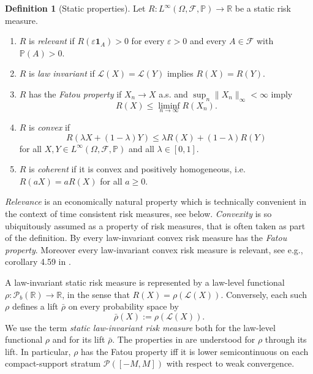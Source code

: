 \documentclass[a4paper]{amsart}
\theoremstyle{definition}
\newtheorem{definition}[definition]{Definition}
\newcommand{\R}{\mathbb{R}}
\newcommand{\F}{\mathcal{F}}
\newcommand{\law}{\mathcal{L}}
\newcommand{\Pc}{\mathcal P}
\renewcommand{\P}{\mathbb{P}}
\begin{document}
\begin{definition}[Static properties]
\label{def:static-properties}
Let \(R:L^\infty(\Omega,\F,\P)\to\R\) be a static risk measure.

\begin{enumerate}[(1)]
\item \(R\) is \emph{relevant} if
\(R(\varepsilon\mathbf 1_A)>0\) for every \(\varepsilon>0\) and every
\(A\in\F\) with \(\P(A)>0\).

\item \(R\) is \emph{law invariant} if \(\law(X)=\law(Y)\) implies
\(R(X)=R(Y)\).

\item \(R\) has the \emph{Fatou property} if \(X_n\to X\) a.s. and
\(\sup_n\|X_n\|_\infty<\infty\) imply
\[
R(X)\le\liminf_{n\to\infty}R(X_n).
\]

\item \(R\) is \emph{convex} if
\[
R(\lambda X+(1-\lambda)Y)
\le
\lambda R(X)+(1-\lambda)R(Y)
\]
for all \(X,Y\in L^\infty(\Omega,\F,\P)\) and all \(\lambda\in[0,1]\).

\item \(R\) is \emph{coherent} if it is convex and positively homogeneous,
i.e.\  \(R(aX)=aR(X)\) for all \(a\ge0\).
\end{enumerate}
\end{definition}
\emph{Relevance} is an economically natural property which is technically convenient in the context of time consistent risk measures, see  below. \emph{Convexity} is so ubiquitously assumed as a property of risk measures, that is often taken as part of the definition. By \cite{JoScTo06} every law-invariant convex risk measure has the \emph{Fatou property}. Moreover every law-invariant convex risk measure is relevant, see e.g., corollary 4.59 in \cite{follmer2025book}.


A law-invariant static risk measure is represented by a law-level functional
\(\rho:\Pc_b(\R)\to\R\), in the sense that \(R(X)=\rho(\law(X))\). Conversely,
each such \(\rho\) defines a lift \(\bar\rho\) on every probability space by
\[
\bar\rho(X):=\rho(\law(X)).
\]
We use the term \emph{static law-invariant risk measure} both for the
law-level functional \(\rho\) and for its lift \(\bar\rho\). The properties in
 are understood for \(\rho\) through its lift. In
particular, \(\rho\) has the Fatou property iff it is lower semicontinuous on
each compact-support stratum \(\Pc([-M,M])\) with respect to weak convergence.
\end{document}
